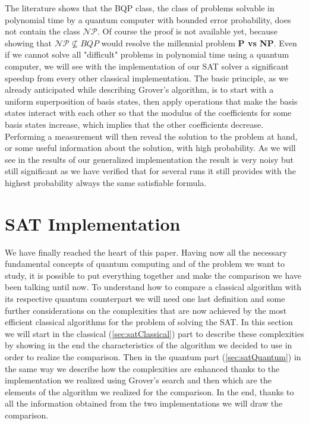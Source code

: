 \documentclass[english]{article}
\begin{document}
			The literature shows that the BQP class, the class of problems solvable in polynomial time by a quantum computer with bounded error probability, does not contain the class $\mathcal{N}\mathcal{P}$. Of course the proof is not available yet, because showing that $\mathcal{N}\mathcal{P}\nsubseteq BQP$ would resolve the millennial problem \textbf{P vs NP}. Even if we cannot solve all "difficult" problems in polynomial time using a quantum computer, we will see with the implementation of our SAT solver a significant speedup from every other classical implementation. The basic principle, as we already anticipated while describing Grover's algorithm, is to start with a uniform superposition of basis states, then apply operations that make the basis states interact with each other so that the modulus of the coefficients for some basis states increase, which implies that the other coefficients decrease. Performing a measurement will then reveal the solution to the problem at hand, or some useful information about the solution, with high probability. As we will see in the results of our generalized implementation the result is very noisy but still significant as we have verified that for several runs it still provides with the highest probability always the same satisfiable formula.
		
	\section{SAT Implementation}
	\label{sec:satImpl}
		We have finally reached the heart of this paper. Having now all the necessary fundamental concepts of quantum computing and of the problem we want to study, it is possible to put everything together and make the comparison we have been talking until now. To understand how to compare a classical algorithm with its respective quantum counterpart we will need one last definition and some further considerations on the complexities that are now achieved by the most efficient classical algorithms for the problem of solving the SAT. In this section we will start in the classical (\ref{sec:satClassical}) part to describe these complexities by showing in the end the characteristics of the algorithm we decided to use in order to realize the comparison. Then in the quantum part (\ref{sec:satQuantum}) in the same way we describe how the complexities are enhanced thanks to the implementation we realized using Grover's search and then which are the elements of the algorithm we realized for the comparison. In the end, thanks to all the information obtained from the two implementations we will draw the comparison. \\
	
\end{document}

